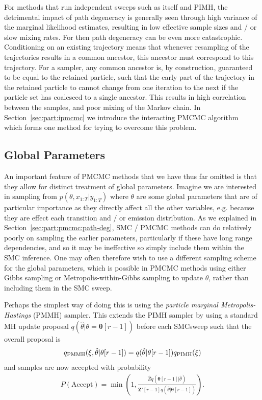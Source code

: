For methods that run independent \smc sweeps such as \smc itself and PIMH, the detrimental impact
of path degeneracy is generally seen through high variance of the marginal likelihood estimates,  resulting
in  low effective sample sizes and / or slow mixing rates.  For \pg then path degeneracy can be even
more catastrophic.  Conditioning on an existing trajectory means 
that whenever resampling of the trajectories results in a common ancestor, this ancestor must correspond 
to this trajectory.  For a \pg sampler, any common ancestor is, by construction, guaranteed to be equal 
to the retained particle, such that the early part of the trajectory in the retained particle to cannot
change from one iteration to the next if the particle set has coalesced to a single ancestor.
This results in high correlation between the samples, and poor mixing of the Markov chain.
In Section~\ref{sec:part:ipmcmc} we introduce the interacting PMCMC algorithm~\citep{rainforth2016interacting}
which forms one method for trying to overcome this problem.

\subsection{Global Parameters}
\label{sec:part:pmcmc:global}

An important feature of PMCMC methods that we have thus far omitted is that they allow for
distinct treatment of global parameters.  Imagine we are interested in sampling from $p(\theta,x_{1:T} | y_{1:T})$
where $\theta$ are some global parameters that are of particular importance as they directly
affect all the other variables, e.g. because they are effect each transition and / or emission distribution.
As we explained in Section~\ref{sec:part:pmcmc:path-deg}, SMC / PMCMC methods can do relatively poorly on sampling
the earlier parameters, particularly if these have long range dependencies, and so it may be ineffective so
simply include them within the SMC inference. One may often therefore wish to use a different sampling scheme
for the global parameters, which is possible in PMCMC methods using either Gibbs sampling or Metropolis-within-Gibbs
sampling to update $\theta$, rather than including them in the SMC sweep.

Perhaps the simplest way of doing this is using the \emph{particle marginal Metropolis-Hastings} (PMMH)
sampler.  This extends the PIMH sampler by using a standard MH update proposal $q(\hat{\theta}|\theta=\mathbf{\theta}[r-1])$ 
before each SMCsweep such that the overall proposal is
\begin{align}
q_{\text{PMMH}}(\mathbf{\xi},\hat{\theta}|\mathbf{\theta}[r-1]) = q(\hat{\theta}|\mathbf{\theta}[r-1]) q_{\text{PIMH}}(\mathbf{\xi})
\end{align}
and samples are now accepted with probability
\begin{align}
P(\text{Accept}) = \min \left(1,\frac{\hat{Z} q(\mathbf{\theta}[r-1] | \hat{\theta})}
{\mathbf{Z}'[r-1] q(\hat{\theta}|\mathbf{\theta}[r-1])}\right).
\end{align}

